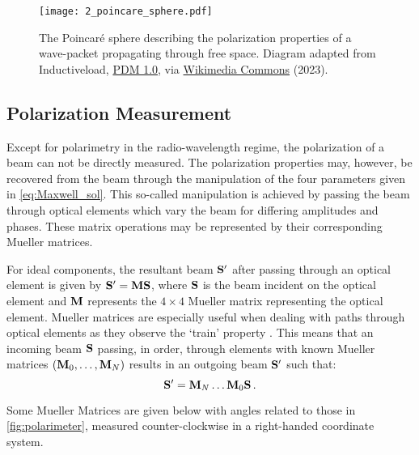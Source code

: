 \begin{figure}[t]
    \centering
    \texttt{[image: 2\_poincare\_sphere.pdf]}
    \caption{
        The Poincar{\'e} sphere describing the polarization properties of a wave-packet propagating through free space.
        Diagram adapted from Inductiveload, \protect\href{https://creativecommons.org/publicdomain/mark/1.0/}{PDM 1.0}, via \protect\href{https://commons.wikimedia.org/wiki/File:Poincaré_sphere.svg}{Wikimedia Commons} (2023).
    }
    \label{fig:poincare}
\end{figure}


\subsection{Polarization Measurement} \label{subsec:pol_measure}

Except for polarimetry in the radio-wavelength regime, the polarization of a beam can not be directly measured.
The polarization properties may, however, be recovered from the beam through the manipulation of the four parameters given in \autoref{eq:Maxwell_sol}.
This so-called manipulation is achieved by passing the beam through optical elements which vary the beam for differing amplitudes and phases.
These matrix operations may be represented by their corresponding Mueller matrices.

For ideal components, the resultant beam $\mathbf{S}^{\prime}$ after passing through an optical element is given by $\mathbf{S}^{\prime} = \mathbf{M} \mathbf{S}$, where $\mathbf{S}$ is the beam incident on the optical element and $\mathbf{M}$ represents the $4 \times 4$ Mueller matrix representing the optical element.
Mueller matrices are especially useful when dealing with paths through optical elements as they observe the `train' property \citep{Mueller_train}.
This means that an incoming beam $\mathbf{S}$ passing, in order, through elements with known Mueller matrices $(\mathbf{M}_{0}, \dots, \mathbf{M}_{N})$ results in an outgoing beam $\mathbf{S}^{\prime}$ such that:
\begin{equation} \label{eq:mueller_train}
    \mathbf{S}^{\prime} = \mathbf{M}_{N} \dots \mathbf{M}_{0} \mathbf{S}\,.
\end{equation}

Some Mueller Matrices are given below with angles related to those in \autoref{fig:polarimeter}, measured counter-clockwise in a right-handed coordinate system.

